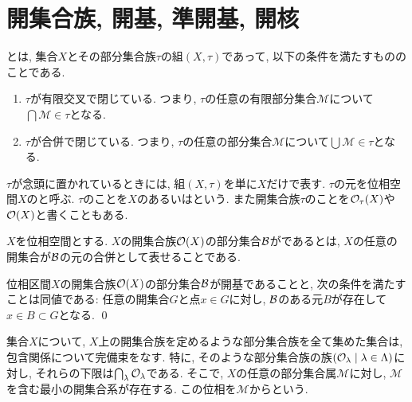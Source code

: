 \documentclass[uplatex, dvipdfmx, a4paper, 12pt, class=jsbook, crop=false]{standalone}
\begin{document}
\section{開集合族, 開基, 準開基, 開核}
\label{sec:open-sets}

\newcommand{\cM}{\mathcal{M}}

\begin{definition}
	とは, 集合$X$とその部分集合族$\tau$の組$(X, \tau)$であって, 以下の条件を満たすもののことである.
	\begin{enumerate}
		\item$\tau$が有限交叉で閉じている.
			つまり, $\tau$の任意の有限部分集合$\mathscr{M}$について$\bigcap \mathscr{M} \in \tau$となる.
		\item$\tau$が合併で閉じている.
			つまり, $\tau$の任意の部分集合$\mathscr{M}$について$\bigcup \mathscr{M} \in \tau$となる.
	\end{enumerate}
	$\tau$が念頭に置かれているときには, 組$(X, \tau)$を単に$X$だけで表す.
	$\tau$の元を位相空間$X$のと呼ぶ.
	$\tau$のことを$X$のあるいはという.
	また開集合族$\tau$のことを$\topopens_\tau (X)$や$\topopens[X]$と書くこともある.
\end{definition}

\begin{definition}
	$X$を位相空間とする.
	$X$の開集合族$\topopens[X]$の部分集合$\mathcal{B}$がであるとは, $X$の任意の開集合が$\mathcal{B}$の元の合併として表せることである.
\end{definition}

\begin{proposition}
	位相区間$X$の開集合族$\topopens[X]$の部分集合$\mathcal{B}$が開基であることと, 次の条件を満たすことは同値である: 任意の開集合$G$と点$x \in G$に対し, $\mathcal{B}$のある元$B$が存在して$x \in B \subset G$となる.
	\qed
\end{proposition}

\begin{definition}
	集合$X$について, $X$上の開集合族を定めるような部分集合族を全て集めた集合は, 包含関係について完備束をなす.
	特に, そのような部分集合族の族$\setfamily{\topopens_\lambda}{\lambda \in \Lambda}$に対し, それらの下限は$\bigcap_\lambda \topopens_\lambda$である.
	そこで, $X$の任意の部分集合属$\cM$に対し, $\cM$を含む最小の開集合系が存在する.
	この位相を$\cM$からという.
\end{definition}
\end{document}
